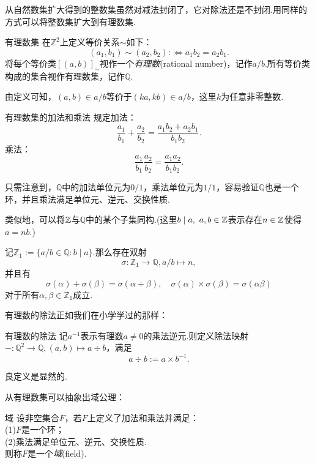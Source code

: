 从自然数集扩大得到的整数集虽然对减法封闭了，它对除法还是不封闭.用同样的方式可以将整数集扩大到有理数集.

\begin{definition}{有理数集}
	在$\mathbb{Z}^2$上定义等价关系$\sim$如下：$$(a_1,b_1) \sim (a_2,b_2) :\Leftrightarrow a_1b_2=a_2b_1.$$
	将每个等价类$[(a,b)]_{\sim}$视作一个\textit{有理数}(rational number)，记作$a/b$.所有等价类构成的集合视作有理数集，记作$\mathbb{Q}$.
\end{definition}

由定义可知，$(a,b)\in a/b$等价于$(ka,kb) \in a/b$，这里$k$为任意非零整数.

\begin{definition}{有理数集的加法和乘法}
	规定加法：$$\frac{a_1}{b_1} + \frac{a_2}{b_2} = \frac{a_1b_2+a_2b_1}{b_1b_2}.$$
	乘法：
	$$\frac{a_1}{b_1} \frac{a_2}{b_2} = \frac{a_1a_2}{b_1b_2}.$$
\end{definition}

只需注意到，$\mathbb{Q}$中的加法单位元为$0/1$，乘法单位元为$1/1$，容易验证$\mathbb{Q}$也是一个环，并且乘法满足单位元、逆元、交换性质.

类似地，可以将$\mathbb{Z}$与$\mathbb{Q}$中的某个子集同构.(这里$b \mid a,~a,b \in \mathbb{Z}$表示存在$n \in \mathbb{Z}$使得$a=nb$.)

\begin{proposition}
	记$\mathbb{Z}_1:=\{ a/b \in \mathbb{Q}:b \mid a \}$.那么存在双射$$\sigma :\mathbb{Z}_1 \to \mathbb{Q},a/b \mapsto n,$$
	并且有$$\sigma (\alpha) + \sigma (\beta) = \sigma (\alpha + \beta),\quad \sigma (\alpha) \times \sigma (\beta) = \sigma (\alpha  \beta)$$
	对于所有$\alpha ,\beta \in \mathbb{Z}_1$成立.
\end{proposition}

有理数的除法正如我们在小学学过的那样：

\begin{definition}{有理数的除法}
	记$a^{-1}$表示有理数$a\neq 0$的乘法逆元.则定义除法映射$-:\mathbb{Q} ^2 \to \mathbb{Q} ,(a,b) \mapsto a \div b$，满足$$a \div b:=a\times b^{-1}.$$
\end{definition}

良定义是显然的.

从有理数集可以抽象出域公理：

\begin{axiom}{域}
	设非空集合$F$，若$F$上定义了加法和乘法并满足： \\
	(1)$F$是一个环； \\
	(2)乘法满足单位元、逆元、交换性质. \\
	则称$F$是一个\textit{域}(field).
\end{axiom}

